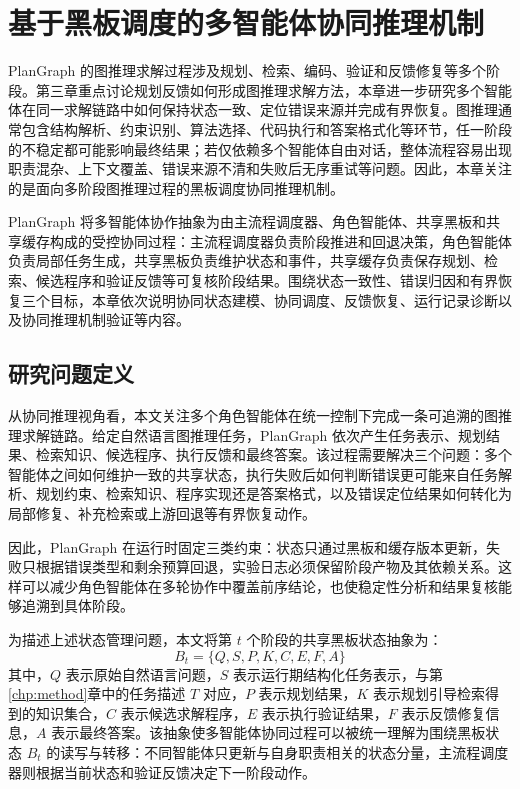 \chapter{基于黑板调度的多智能体协同推理机制}
\label{chp:system}

PlanGraph 的图推理求解过程涉及规划、检索、编码、验证和反馈修复等多个阶段。第三章重点讨论规划反馈如何形成图推理求解方法，本章进一步研究多个智能体在同一求解链路中如何保持状态一致、定位错误来源并完成有界恢复。图推理通常包含结构解析、约束识别、算法选择、代码执行和答案格式化等环节，任一阶段的不稳定都可能影响最终结果；若仅依赖多个智能体自由对话，整体流程容易出现职责混杂、上下文覆盖、错误来源不清和失败后无序重试等问题。因此，本章关注的是面向多阶段图推理过程的黑板调度协同推理机制。

PlanGraph 将多智能体协作抽象为由主流程调度器、角色智能体、共享黑板和共享缓存构成的受控协同过程：主流程调度器负责阶段推进和回退决策，角色智能体负责局部任务生成，共享黑板负责维护状态和事件，共享缓存负责保存规划、检索、候选程序和验证反馈等可复核阶段结果。围绕状态一致性、错误归因和有界恢复三个目标，本章依次说明协同状态建模、协同调度、反馈恢复、运行记录诊断以及协同推理机制验证等内容。

\section{研究问题定义}

从协同推理视角看，本文关注多个角色智能体在统一控制下完成一条可追溯的图推理求解链路。给定自然语言图推理任务，PlanGraph 依次产生任务表示、规划结果、检索知识、候选程序、执行反馈和最终答案。该过程需要解决三个问题：多个智能体之间如何维护一致的共享状态，执行失败后如何判断错误更可能来自任务解析、规划约束、检索知识、程序实现还是答案格式，以及错误定位结果如何转化为局部修复、补充检索或上游回退等有界恢复动作。

因此，PlanGraph 在运行时固定三类约束：状态只通过黑板和缓存版本更新，失败只根据错误类型和剩余预算回退，实验日志必须保留阶段产物及其依赖关系。这样可以减少角色智能体在多轮协作中覆盖前序结论，也使稳定性分析和结果复核能够追溯到具体阶段。

为描述上述状态管理问题，本文将第 $t$ 个阶段的共享黑板状态抽象为：
\begin{equation}
B_t=\{Q,S,P,K,C,E,F,A\}
\end{equation}
其中，$Q$ 表示原始自然语言问题，$S$ 表示运行期结构化任务表示，与第\ref{chp:method}章中的任务描述 $T$ 对应，$P$ 表示规划结果，$K$ 表示规划引导检索得到的知识集合，$C$ 表示候选求解程序，$E$ 表示执行验证结果，$F$ 表示反馈修复信息，$A$ 表示最终答案。该抽象使多智能体协同过程可以被统一理解为围绕黑板状态 $B_t$ 的读写与转移：不同智能体只更新与自身职责相关的状态分量，主流程调度器则根据当前状态和验证反馈决定下一阶段动作。

